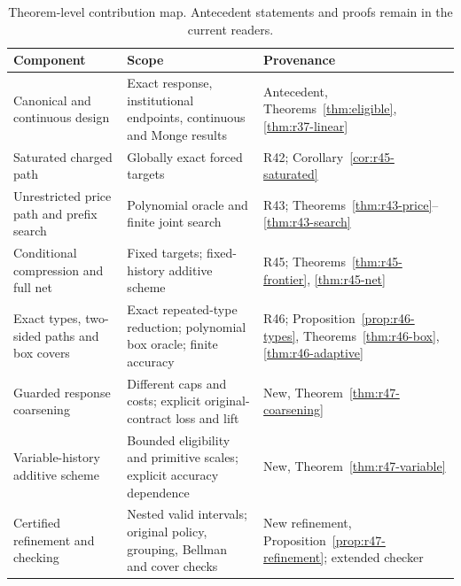 \begin{table}[p]\centering
\caption{Theorem-level contribution map. Antecedent statements and proofs remain in the current readers.}\label{tab:r46-contributions}
\begin{tabular}{p{}p{}p{}}\toprule
Component & Scope & Provenance \\\midrule
Canonical and continuous design & Exact response, institutional endpoints, continuous and Monge results & Antecedent, Theorems~\ref{thm:eligible}, \ref{thm:r37-linear} \\
Saturated charged path & Globally exact forced targets & R42; Corollary~\ref{cor:r45-saturated} \\
Unrestricted price path and prefix search & Polynomial oracle and finite joint search & R43; Theorems~\ref{thm:r43-price}--\ref{thm:r43-search} \\
Conditional compression and full net & Fixed targets; fixed-history additive scheme & R45; Theorems~\ref{thm:r45-frontier}, \ref{thm:r45-net} \\
Exact types, two-sided paths and box covers & Exact repeated-type reduction; polynomial box oracle; finite accuracy & R46; Proposition~\ref{prop:r46-types}, Theorems~\ref{thm:r46-box}, \ref{thm:r46-adaptive} \\
Guarded response coarsening & Different caps and costs; explicit original-contract loss and lift & New, Theorem~\ref{thm:r47-coarsening} \\
Variable-history additive scheme & Bounded eligibility and primitive scales; explicit accuracy dependence & New, Theorem~\ref{thm:r47-variable} \\
Certified refinement and checking & Nested valid intervals; original policy, grouping, Bellman and cover checks & New refinement, Proposition~\ref{prop:r47-refinement}; extended checker \\
\bottomrule\end{tabular}\end{table}
